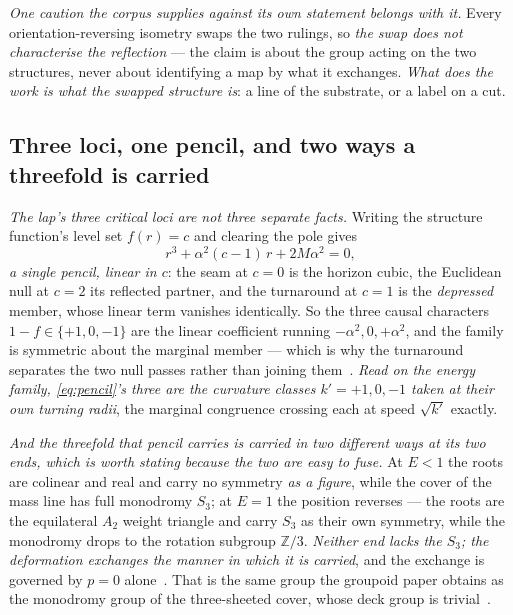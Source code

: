 \documentclass[11pt,a4paper]{article}
\theoremstyle{plain}
\theoremstyle{definition}
\begin{document}
\emph{One caution the corpus supplies against its own statement belongs with it.} Every orientation-reversing
isometry swaps the two rulings, so \emph{the swap does not characterise the reflection} --- the claim is about
the group acting on the two structures, never about identifying a map by what it exchanges. \emph{What does
the work is what the swapped structure is}: a line of the substrate, or a label on a cut.

\subsection{Three loci, one pencil, and two ways a threefold is carried}

\emph{The lap's three critical loci are not three separate facts.} Writing the structure function's level
set $f(r)=c$ and clearing the pole gives
\begin{equation}
r^{3}+\alpha^{2}(c-1)\,r+2M\alpha^{2}=0,
\label{eq:pencil}
\end{equation}
\emph{a single pencil, linear in $c$}: the seam at $c=0$ is the horizon cubic, the Euclidean null at $c=2$
its reflected partner, and the turnaround at $c=1$ is the \emph{depressed} member, whose linear term vanishes
identically. So the three causal characters $1-f\in\{+1,0,-1\}$ are the linear coefficient running
$-\alpha^{2},0,+\alpha^{2}$, and the family is symmetric about the marginal member --- which is why the
turnaround separates the two null passes rather than joining them~\cite{JanzenCRframework}. \emph{Read on the
energy family, \eqref{eq:pencil}'s three are the curvature classes $k'=+1,0,-1$ taken at their own turning radii}, the
marginal congruence crossing each at speed $\sqrt{k'}$ exactly.

\emph{And the threefold that pencil carries is carried in two different ways at its two ends, which is worth
stating because the two are easy to fuse.} At $E<1$ the roots are colinear and real and carry no symmetry
\emph{as a figure}, while the cover of the mass line has full monodromy $S_{3}$; at $E=1$ the position
reverses --- the roots are the equilateral $A_{2}$ weight triangle and carry $S_{3}$ as their own symmetry,
while the monodromy drops to the rotation subgroup $\mathbb{Z}/3$. \emph{Neither end lacks the $S_{3}$; the
deformation exchanges the manner in which it is carried}, and the exchange is governed by $p=0$
alone~\cite{JanzenCRframework}. That is the same group the groupoid paper obtains as the monodromy group of the
three-sheeted cover, whose deck group is trivial~\cite{JanzenGroupoid}.
\end{document}
